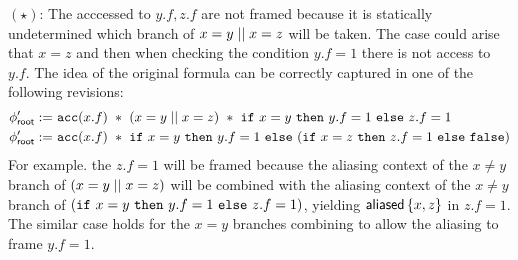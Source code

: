 $(\star)$: The acccessed to $y.f, z.f$ are not framed because it is statically undetermined which branch of $x = y \mid\mid x = z$ will be taken. The case could arise that $x = z$ and then when checking the condition $y.f = 1$ there is not access to $y.f$. The idea of the original formula can be correctly captured in one of the following revisions:
\begin{align*}
\phi^\prime_\textsf{root} := & \
\texttt{acc}(x.f) \ \ast \
(x = y \mid\mid x = z) \ \ast \
\texttt{if} \ x = y \
  \texttt{then} \ y.f = 1 \
  \texttt{else} \ z.f = 1
\\
\phi^\prime_\textsf{root} := & \
\texttt{acc}(x.f) \ \ast \
\texttt{if} \ x = y \
  \texttt{then} \ y.f = 1 \
  \texttt{else} \
    (\texttt{if} \ x = z \
      \texttt{then} \ z.f = 1 \
      \texttt{else} \ \texttt{false})
\end{align*}
For example. the $z.f = 1$ will be framed because the aliasing context of the $x \neq y$ branch of $(x = y \mid\mid x = z)$ will be combined with the aliasing context of the $x \neq y$ branch of $(\cif \ x = y \ \cthen \ y.f = 1 \ \celse \ z.f = 1)$, yielding $\textsf{aliased}\left\{ x,z \right\}$ in $z.f = 1$. The similar case holds for the $x = y$ branches combining to allow the aliasing to frame $y.f = 1$.


%
